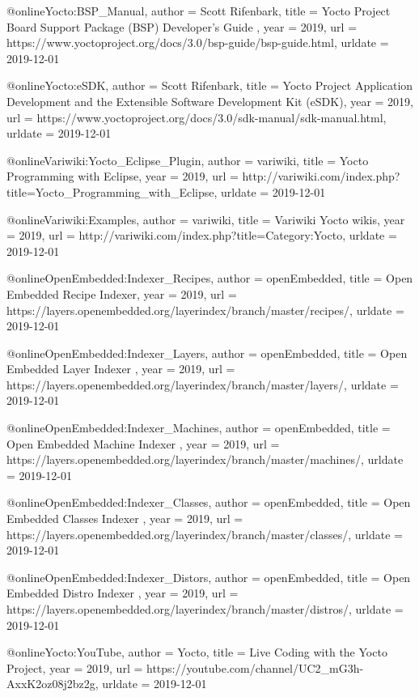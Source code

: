 @online{Yocto:BSP_Manual,
author = {Scott Rifenbark},
title = {Yocto Project Board Support Package (BSP) Developer's Guide },
year = 2019,
url = {https://www.yoctoproject.org/docs/3.0/bsp-guide/bsp-guide.html},
urldate = {2019-12-01}
}


@online{Yocto:eSDK,
author = {Scott Rifenbark},
title = {Yocto Project Application Development and the Extensible Software Development Kit (eSDK)},
year = 2019,
url = {https://www.yoctoproject.org/docs/3.0/sdk-manual/sdk-manual.html},
urldate = {2019-12-01}
}




@online{Variwiki:Yocto_Eclipse_Plugin,
author = {variwiki},
title = {Yocto Programming with Eclipse},
year = 2019,
url = {http://variwiki.com/index.php?title=Yocto_Programming_with_Eclipse},
urldate = {2019-12-01}
}


@online{Variwiki:Examples,
author = {variwiki},
title = {Variwiki Yocto wikis},
year = 2019,
url = {http://variwiki.com/index.php?title=Category:Yocto},
urldate = {2019-12-01}
}


@online{OpenEmbedded:Indexer_Recipes,
author = {openEmbedded},
title = {Open Embedded Recipe Indexer},
year = 2019,
url = {https://layers.openembedded.org/layerindex/branch/master/recipes/},
urldate = {2019-12-01}
}


@online{OpenEmbedded:Indexer_Layers,
author = {openEmbedded},
title = {Open Embedded Layer Indexer },
year = 2019,
url = {https://layers.openembedded.org/layerindex/branch/master/layers/},
urldate = {2019-12-01}
}


@online{OpenEmbedded:Indexer_Machines,
author = {openEmbedded},
title = {Open Embedded Machine Indexer },
year = 2019,
url = {https://layers.openembedded.org/layerindex/branch/master/machines/},
urldate = {2019-12-01}
}

@online{OpenEmbedded:Indexer_Classes,
author = {openEmbedded},
title = {Open Embedded Classes Indexer },
year = 2019,
url = {https://layers.openembedded.org/layerindex/branch/master/classes/},
urldate = {2019-12-01}
}

@online{OpenEmbedded:Indexer_Distors,
author = {openEmbedded},
title = {Open Embedded Distro Indexer },
year = 2019,
url = {https://layers.openembedded.org/layerindex/branch/master/distros/},
urldate = {2019-12-01}
}

@online{Yocto:YouTube,
author = {Yocto},
title = {Live Coding with the Yocto Project},
year = 2019,
url = {https://youtube.com/channel/UC2_mG3h-AxxK2oz08j2bz2g},
urldate = {2019-12-01}
}

